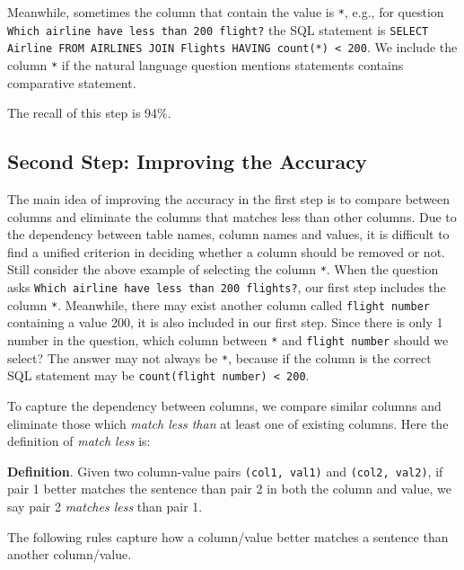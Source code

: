Meanwhile, sometimes the column that contain the value is \texttt{*}, e.g., for question \texttt{Which airline have less than 200 flight?} the SQL statement is \texttt{SELECT Airline FROM AIRLINES JOIN Flights HAVING count(*) < 200}. We include the column \texttt{*} if the natural language question mentions statements contains comparative statement. 

The recall of this step is 94\%.

\subsection{Second Step: Improving the Accuracy}

The main idea of improving the accuracy in the first step is to compare between columns and eliminate the columns that matches less than other columns. Due to the dependency between table names, column names and values, it is difficult to find a unified criterion in deciding whether a column should be removed or not. Still consider the above example of selecting the column \texttt{*}. When the question asks \texttt{Which airline have less than 200 flights?}, our first step includes the column \texttt{*}. Meanwhile, there may exist another column called \texttt{flight number} containing a value 200, it is also included in our first step. Since there is only 1 number in the question, which column between \texttt{*} and \texttt{flight number} should we select? The answer may not always be \texttt{*}, because if the column  is  the correct SQL statement may be \texttt{count(flight number) < 200}. 

To capture the dependency between columns, we compare similar columns and eliminate those which \emph{match less than} at least one of existing columns. Here the definition of \emph{match less} is:

\textbf{Definition}. Given two column-value pairs \texttt{(col1, val1)} and \texttt{(col2, val2)}, if pair 1 better matches the sentence than pair 2 in both the column and value, we say pair 2 \emph{matches less} than pair 1. 

The following rules capture how a column/value better matches a sentence than another column/value.

